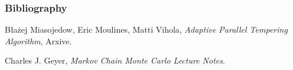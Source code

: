 \begin{frame}

	\frametitle{Bibliography}
	
	
	\begin{thebibliography}{10}

		\beamertemplatebookbibitems
		
	  			Błażej Miasojedow, Eric Moulines, Matti Vihola,
	 			\emph{Adaptive Parallel Tempering Algorithm},
	  			Arxive.

		\beamertemplatearticlebibitems
		
				Charles J. Geyer,
				\emph{Markov Chain Monte Carlo Lecture Notes}.  

	\end{thebibliography}

\end{frame}

